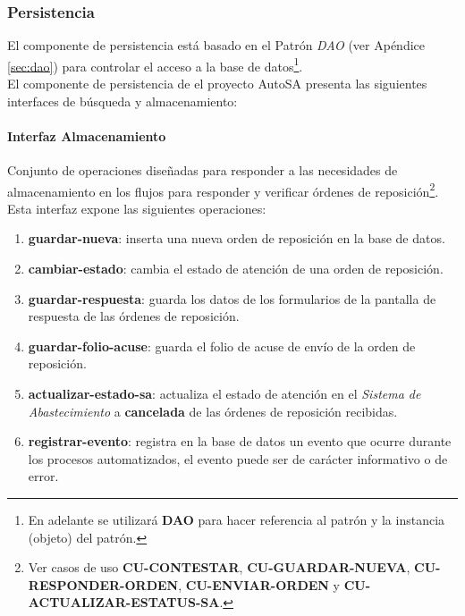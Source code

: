 \subsubsection{Persistencia}
El componente de persistencia está basado en el Patrón \textit{DAO} (ver Apéndice \ref{sec:dao}) para controlar el acceso a la base de datos\footnote{En adelante se utilizará \textbf{DAO} para hacer referencia al patrón y la instancia (objeto) del patrón.}.\\
El componente de persistencia de el proyecto AutoSA presenta las siguientes interfaces de búsqueda y almacenamiento:
\paragraph{\indent Interfaz Almacenamiento\\}
Conjunto de operaciones diseñadas para responder a las necesidades de almacenamiento en los flujos para responder y verificar órdenes de reposición\footnote{Ver casos de uso \textbf{CU-CONTESTAR}, \textbf{CU-GUARDAR-NUEVA}, \textbf{CU-RESPONDER-ORDEN}, \textbf{CU-ENVIAR-ORDEN} y \textbf{CU-ACTUALIZAR-ESTATUS-SA}.}. Esta interfaz expone las siguientes operaciones:
\begin{enumerate}
	\item \textbf{guardar-nueva}: inserta una nueva orden de reposición en la base de datos.
	\item \textbf{cambiar-estado}: cambia el estado de atención de una orden de reposición.
	\item \textbf{guardar-respuesta}: guarda los datos de los formularios de la pantalla de respuesta de las órdenes de reposición.
	\item \textbf{guardar-folio-acuse}: guarda el folio de acuse de envío de la orden de reposición.
	\item \textbf{actualizar-estado-sa}: actualiza el estado de atención en el \textit{Sistema de Abastecimiento} a \textbf{cancelada} de las órdenes de reposición recibidas.
	\item \textbf{registrar-evento}: registra en la base de datos un evento que ocurre durante los procesos automatizados, el evento puede ser de carácter informativo o de error.
\end{enumerate}

